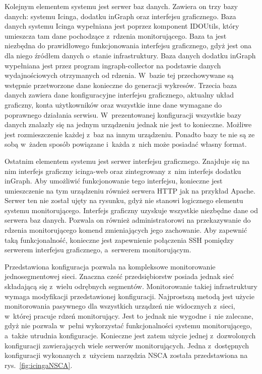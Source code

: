 Kolejnym elementem systemu jest serwer baz danych. Zawiera on trzy
bazy danych: systemu Icinga, dodatku inGraph oraz interfejsu
graficznego. Baza danych systemu Icinga wypełniana jest poprzez
komponent IDOUtils, który umieszcza tam dane pochodzące z~rdzenia
monitorującego. Baza ta jest niezbędna do prawidłowego funkcjonowania
interfejsu graficznego, gdyż jest ona dla niego źródłem danych
o~stanie infrastruktury. Baza danych dodatku inGraph wypełniana jest
przez program ingraph-collector na podstawie danych wydajnościowych
otrzymanych od rdzenia. W~bazie tej przechowywane są wstępnie
przetworzone dane konieczne do generacji wykresów. Trzecia baza danych
zawiera dane konfiguracyjne interfejsu graficznego, aktualny układ
graficzny, konta użytkowników oraz wszystkie inne dane wymagane do
poprawnego działania serwisu. W~prezentowanej konfiguracji wszystkie
bazy danych znalazły się na jednym urządzeniu jednak nie jest to
konieczne. Możliwe jest rozmieszczenie każdej z~baz na innym
urządzeniu. Ponadto bazy te nie są ze sobą w~żaden sposób powiązane
i~każda z~nich może posiadać własny format.

Ostatnim elementem systemu jest serwer interfejsu
graficznego. Znajduje się na nim interfejs graficzny icinga-web oraz
zintegrowany z~nim interfejs dodatku inGraph. Aby umożliwić
funkcjonowanie tego interfejsu, konieczne jest umieszczenie na tym
urządzeniu również serwera HTTP jak na przykład Apache. Serwer ten nie
został ujęty na rysunku, gdyż nie stanowi logicznego elementu systemu
monitorującego. Interfejs graficzny uzyskuje wszystkie niezbędne dane
od serwera baz danych. Pozwala on również administratorowi na
przekazywanie do rdzenia monitorującego komend zmieniających jego
zachowanie. Aby zapewnić taką funkcjonalność, konieczne jest
zapewnienie połączenia SSH pomiędzy serwerem interfejsu graficznego,
a~serwerem monitorującym.

Przedstawiona konfiguracja pozwala na kompleksowe monitorowanie
jednosegmentowej sieci. Znaczna cześć przedsiębiorstw posiada jednak
sieć składającą się z~wielu odrębnych segmentów. Monitorowanie takiej
infrastruktury wymaga modyfikacji przedstawionej
konfiguracji. Najprostszą metodą jest użycie monitorowania pasywnego
dla wszystkich urządzeń nie widocznych z~sieci, w~której pracuje rdzeń
monitorujący. Jest to jednak nie wygodne i~nie zalecane, gdyż nie
pozwala w~pełni wykorzystać funkcjonalności systemu monitorującego,
a~także utrudnia konfiguracje. Konieczne jest zatem użycie jednej
z~dozwolonych konfiguracji zawierających wiele serwerów
monitorujących. Jedna z~dostępnych konfiguracji wykonanych z~użyciem
narzędzia NSCA została przedstawiona na rys.~\ref{fig:icingaNSCA}.

